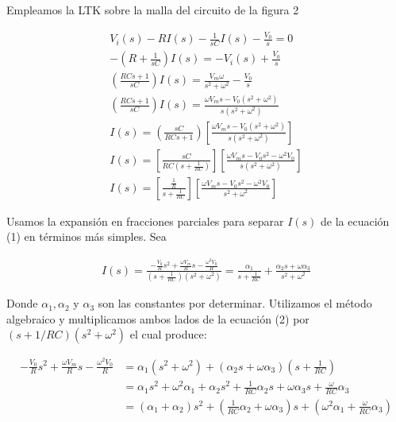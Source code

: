 \documentclass{article}
\begin{document}
\noindent Empleamos la LTK sobre la malla del circuito de la figura 2

\begin{align}
	V_i(s) - RI(s) - \frac{1}{sC}I(s) - \frac{V_0}{s} = 0 \nonumber \\
	- \left( R + \frac{1}{sC} \right)I(s) = - V_i (s) + \frac{V_0}{s} \nonumber \\
	\left( \frac{RCs + 1}{sC} \right)I(s) = \frac{V_m \omega}{s^2 + \omega^2} - \frac{V_0}{s} \nonumber \\
	\left( \frac{RCs + 1}{sC} \right)I(s) = \frac{\omega V_m s - V_0(s^2 + \omega^2)}{s(s^2 + \omega^2)} \nonumber \\
	I(s) = \left(  \frac{sC}{RCs + 1} \right) \left[ \frac{\omega V_m s - V_0(s^2 + \omega^2)}{s(s^2 + \omega^2)} \right] \nonumber \\
	I(s) = \left[ \frac{sC}{RC(s + \frac{1}{RC})} \right] \left[ \frac{\omega V_m s - V_0s^2 - \omega^2 V_0}{s(s^2 + \omega^2)} \right] \nonumber \\
	I(s) = \left[ \frac{\frac{1}{R}}{s + \frac{1}{RC}} \right] \left[ \frac{\omega V_m s - V_0s^2 - \omega^2 V_0}{s^2 + \omega^2} \right]
\end{align}

\noindent Usamos la expansión en fracciones parciales para separar $I(s)$ de la ecuación (1) en términos más simples. Sea

\begin{align}
	I(s) = \frac{ -\frac{V_0}{R}s^2 + \frac{\omega V_m}{R}s - \frac{\omega^2 V_0}{R} }{\left( s + \frac{1}{RC} \right) \left( s^2 + \omega^2 \right)} = \frac{\alpha_1}{s + \frac{1}{RC}} + \frac{\alpha_2 s + \omega \alpha_3}{s^2 + \omega^2}
\end{align}

\noindent Donde $\alpha_1, \alpha_2$ y $\alpha_3$ son las constantes por determinar. Utilizamos el método algebraico y multiplicamos ambos lados de la ecuación (2) por $(s + 1/RC)(s^2 + \omega^2)$ el cual produce:

\begin{align}
	-\frac{V_0}{R}s^2 + \frac{\omega V_m}{R}s - \frac{\omega^2 V_0}{R} &= \alpha_1 (s^2 + \omega^2) + (\alpha_2 s + \omega \alpha_3)\left( s + \frac{1}{RC} \right) \nonumber \\
	&= \alpha_1 s^2 + \omega^2 \alpha_1 + \alpha_2 s^2 + \frac{1}{RC}\alpha_2 s + \omega \alpha_3 s + \frac{\omega}{RC} \alpha_3 \nonumber \\
	&= (\alpha_1 + \alpha_2)s^2 + \left( \frac{1}{RC} \alpha_2 + \omega \alpha_3 \right)s + \left( \omega ^2 \alpha_1 + \frac{\omega}{RC}\alpha_3 \right)    
\end{align}
\end{document}

